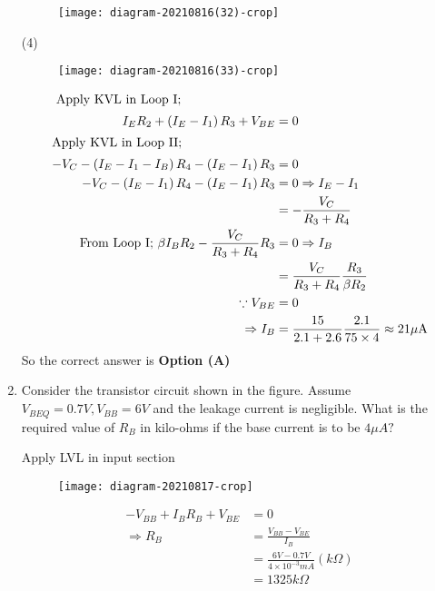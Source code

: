 \begin{enumerate}
\begin{figure}[H]
\centering
\texttt{[image: diagram-20210816(32)-crop]}
\end{figure}
\begin{tasks}(4)
\end{tasks}
\begin{answer}
\begin{figure}[H]
	\centering
	\texttt{[image: diagram-20210816(33)-crop]}
\end{figure}
\begin{align*}
\intertext{	Apply KVL in Loop I; }I_{E} R_{2}+\left(I_{E}-I_{1}\right) R_{3}+V_{B E}&=0\\
\intertext{Apply KVL in Loop II; }-V_{C}-\left(I_{E}-I_{1}-I_{B}\right) R_{4}-\left(I_{E}-I_{1}\right) R_{3}&=0\\
-V_{C}-\left(I_{E}-I_{1}\right) R_{4}-\left(I_{E}-I_{1}\right) R_{3}&=0 \Rightarrow I_{E}-I_{1}\\&=-\frac{V_{C}}{R_{3}+R_{4}}\\
\text{From Loop I; }\beta I_{B} R_{2}-\frac{V_{C}}{R_{3}+R_{4}} R_{3}&=0 \Rightarrow I_{B}\\&=\frac{V_{C}}{R_{3}+R_{4}} \frac{R_{3}}{\beta R_{2}}\\
\because V_{B E}&=0\\
\Rightarrow I_{B}&=\frac{15}{2.1+2.6} \frac{2.1}{75 \times 4} \approx 21 \mu \mathrm{A}
\end{align*}
So the correct answer is \textbf{Option (A)}
\end{answer}
	\item Consider the transistor circuit shown in the figure. Assume $V_{B E Q}=0.7 V, V_{B B}=6 V$ and the leakage current is negligible. What is the required value of
$R_{B}$ in kilo-ohms if the base current is to be $4 \mu A ?$
{}

\begin{answer}
Apply LVL in input section\\
\begin{figure}[H]
	\centering
	\texttt{[image: diagram-20210817-crop]}
	\caption{}
	\label{}
\end{figure}
\begin{align*}
-V_{B B}+I_{B} R_{B}+V_{B E}&=0\\
\Rightarrow R_{B}&=\frac{V_{B B}-V_{B E}}{I_{B}}\\&=\frac{6 V-0.7 V}{4 \times 10^{-3} m A}(k \Omega)\\&=1325 k \Omega
\end{align*}
\end{answer}
\end{enumerate}
